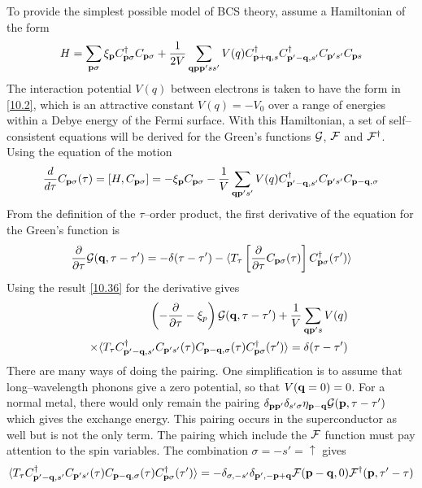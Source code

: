 To provide the simplest possible model of BCS theory, assume a Hamiltonian of the form
\begin{equation}
    H = \sum_{\mathbf{p} \sigma} \xi_{\mathbf{p}} C^\dagger_{\mathbf{p}\sigma} C_{\mathbf{p}\sigma}  +  \frac{1}{2V} \sum_{\mathbf{q} \mathbf{p} \mathbf{p}' s s'} V(q) C^\dagger_{\mathbf{p}+\mathbf{q},s} C^\dagger_{\mathbf{p}'-\mathbf{q},s'} C_{\mathbf{p}' s'} C_{\mathbf{p} s}   \label{10.35}
\end{equation}
The interaction potential $V(q)$ between electrons is taken to have the form in \eqref{10.2}, which is an attractive constant $V(q) = - V_0$ over a range of energies within a Debye energy of the Fermi surface.
With this Hamiltonian, a set of self--consistent equations will be derived for the Green's functions $\mathcal{G}$, $\mathcal{F}$ and $\mathcal{F}^\dagger$.
Using the equation of the motion
\begin{equation}
    \frac{d}{d\tau} C_{\mathbf{p}\sigma} (\tau) = \left[H, C_{\mathbf{p}\sigma} \right] = -\xi_{\mathbf{p}} C_{\mathbf{p}\sigma} - \frac{1}{V} \sum_{\mathbf{q} \mathbf{p}' s'} V(q) C^\dagger_{\mathbf{p}'-\mathbf{q},s'} C_{\mathbf{p}'s'} C_{\mathbf{p}-\mathbf{q},\sigma}  \label{10.36}
\end{equation}
From the definition of the $\tau$--order product, the first derivative of the equation for the Green's function is
\begin{equation}
    \frac{\partial}{\partial \tau} \mathcal{G}(\mathbf{q},\tau-\tau') = - \delta(\tau-\tau') - \langle T_\tau \left[ \frac{\partial}{\partial \tau} C_{\mathbf{p}\sigma}(\tau) \right] C^\dagger_{\mathbf{p}\sigma}(\tau') \rangle   \label{10.38}
\end{equation}
Using the result \eqref{10.36} for the derivative gives
\begin{eqnarray}
    &~&\left( - \frac{\partial}{\partial \tau}  - \xi_p \right) \mathcal{G}(\mathbf{q},\tau-\tau') + \frac{1}{V} \sum_{\mathbf{q}\mathbf{p}'s} V(q) \nonumber \\
    &~& \times \langle T_\tau C^\dagger_{\mathbf{p}'-\mathbf{q},s'} C_{\mathbf{p}'s'}(\tau) C_{\mathbf{p}-\mathbf{q},\sigma}(\tau) C^\dagger_{\mathbf{p}\sigma}(\tau') \rangle = \delta(\tau-\tau')    \label{10.40}
\end{eqnarray}
There are many ways of doing the pairing.
One simplification is to assume that long--wavelength phonons give a zero potential, so that $V(\mathbf{q}=0) = 0$.
For a normal metal, there would only remain the pairing $\delta_{\mathbf{p}\mathbf{p}'} \delta_{s'\sigma} \eta_{\mathbf{p}-\mathbf{q}} \mathcal{G}(\mathbf{p},\tau-\tau')$ which gives the exchange energy.
This pairing occurs in the superconductor as well but is not the only term.
The pairing which include the $\mathcal{F}$ function must pay attention to the spin variables.
The combination $\sigma= - s' = \uparrow$ gives
\begin{equation}
    \langle T_\tau C^\dagger_{\mathbf{p}'-\mathbf{q},s'} C_{\mathbf{p}'s'}(\tau) C_{\mathbf{p}-\mathbf{q},\sigma}(\tau) C^\dagger_{\mathbf{p}\sigma}(\tau') \rangle = - \delta_{\sigma,-s'} \delta_{\mathbf{p}',-\mathbf{p}+\mathbf{q}} \mathcal{F}(\mathbf{p}-\mathbf{q},0) \mathcal{F}^\dagger(\mathbf{p},\tau'-\tau) \label{10.42}
\end{equation}
